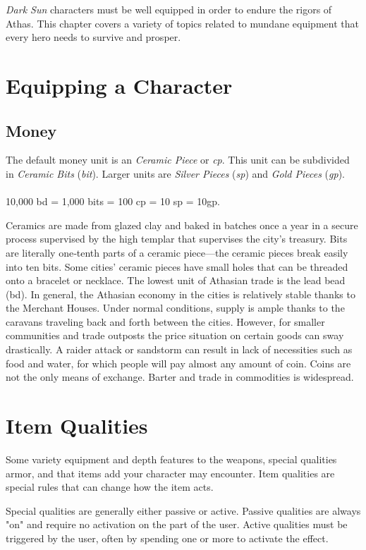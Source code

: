 \begin{multicols}{2}

\textit{Dark Sun} characters must be well equipped in order to
endure the rigors of Athas. This chapter covers a variety
of topics related to mundane equipment that every hero
needs to survive and prosper.

\section{Equipping a Character}
\subsection{Money}
The default money unit is an \textit{Ceramic Piece} or \textit{cp}. This
unit can be subdivided in \textit{Ceramic Bits} (\textit{bit}). Larger units
are \textit{Silver Pieces} (\textit{sp}) and \textit{Gold Pieces}
(\textit{gp}).\\
\\
10,000 bd = 1,000 bits = 100 cp = 10 sp = 10gp.

Ceramics are made from glazed clay and baked in batches once a year in a secure
process supervised by the high templar that supervises the city’s treasury. Bits
are literally one‐tenth parts of a ceramic piece—the ceramic pieces break easily
into ten bits. Some cities’ ceramic pieces have small holes that can be threaded
onto a bracelet or necklace. The lowest unit of Athasian trade is the lead bead
(bd).  In general, the Athasian economy in the cities is relatively stable thanks
to the Merchant Houses. Under normal conditions, supply is ample thanks to the
caravans traveling back and forth between the cities. However, for smaller
communities and trade outposts the price situation on certain goods can sway
drastically. A raider attack or sandstorm can result in lack of necessities such
as food and water, for which people will pay almost any amount of coin. Coins
are not the only means of exchange. Barter and trade in commodities is widespread.

\section{Item Qualities}\label{sec:item-qualities}
Some variety equipment and depth features to the weapons, special qualities
armor, and that items add your character may encounter. Item qualities are
special rules that can change how the item acts.

Special qualities are generally either passive or active. Passive qualities are
always "on" and require no activation on the part of the user. Active qualities
must be triggered by the user, often by spending one or more \advantage to
activate the effect.


\end{multicols}
